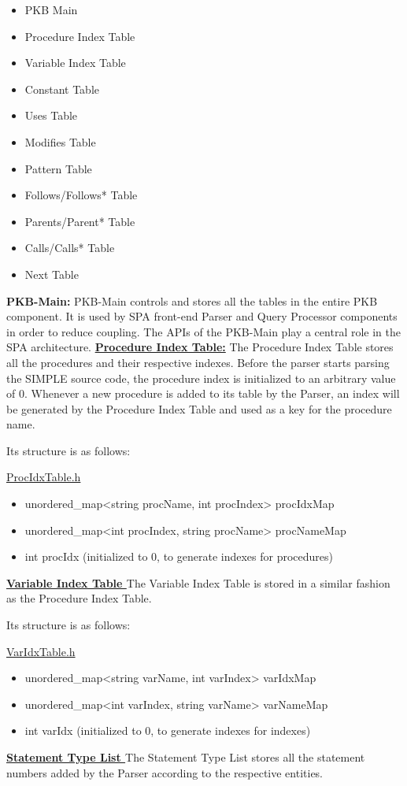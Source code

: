 \documentclass[12pt]{article}
\begin{document}
\begin{itemize}
\item PKB Main 
\item Procedure Index Table
\item Variable Index Table
\item Constant Table
\item Uses Table
\item Modifies Table
\item Pattern Table
\item Follows/Follows* Table
\item Parents/Parent* Table
\item Calls/Calls* Table
\item Next Table
\end{itemize}
\vspace{2mm}
\textbf{PKB-Main:} PKB-Main controls and stores all the tables in the entire PKB component. It is used by SPA front-end Parser and Query Processor components in order to reduce coupling. The APIs of the PKB-Main play a central role in the SPA architecture. \vspace{6mm}
 \newline
\textbf{\underline{Procedure Index Table:}}
\newline The Procedure Index Table stores all the procedures and their respective indexes. Before the parser starts parsing the SIMPLE source code, the procedure index is initialized to an arbitrary value of 0. Whenever a new procedure is added to its table by the Parser, an index will be generated by the Procedure Index Table and used as a key for the procedure name.

Its structure is as follows:

\underline{ProcIdxTable.h}
\begin{itemize}
\item unordered\_map<string procName, int procIndex> procIdxMap
\item unordered\_map<int procIndex, string procName> procNameMap
\item int procIdx (initialized to 0, to generate indexes for procedures)
\end{itemize}
\vspace{6mm}
\textbf{\underline{Variable Index Table
}}
\newline The Variable Index Table is stored in a similar fashion as the Procedure Index Table.

Its structure is as follows:

\underline{VarIdxTable.h}
\begin{itemize}
\item unordered\_map<string varName, int varIndex> varIdxMap
\item unordered\_map<int varIndex, string varName> varNameMap
\item int varIdx (initialized to 0, to generate indexes for indexes)
\end{itemize}
\vspace{6mm}
\textbf{\underline{Statement Type List
}}
\newline The Statement Type List stores all the statement numbers added by the Parser according to the respective entities. 
\end{document}
